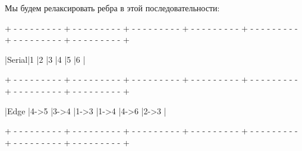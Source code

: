 \vspace{\baselineskip}

Мы будем релаксировать ребра в этой последовательности:

\vspace{\baselineskip}

\begin{tcolorbox}
{\tiny{+ - - - - - - - - - + - - - - - - - - - + - - - - - - - - - + - - - - - - - - - + - - - - - - - - - + - - - - - - - - - + - - - - - - - - - +}}

\hspace{0.4mm}|\hspace{3.7mm}Serial\hspace{3.6mm}|\hspace{7.1mm}1\hspace{7.1mm} |\hspace{7.1mm}2\hspace{7.1mm} |\hspace{7.1mm}3\hspace{6.8mm} |\hspace{7.1mm}4\hspace{7.1mm} |\hspace{7.1mm}5\hspace{6.8mm} |\hspace{6.8mm}6\hspace{7.3mm} |

{\tiny{+ - - - - - - - - - + - - - - - - - - - + - - - - - - - - - + - - - - - - - - - + - - - - - - - - - + - - - - - - - - - + - - - - - - - - - +}}

\hspace{0.4mm}|\hspace{3.5mm}Edge\hspace{3.5mm}
|\hspace{3.7mm}4->5\hspace{3.7mm} |\hspace{3.7mm}3->4\hspace{3.7mm} |\hspace{3.7mm}1->3\hspace{3.7mm} |\hspace{3.7mm}1->4\hspace{3.7mm} |\hspace{3.7mm}4->6\hspace{3.7mm} |\hspace{3.7mm}2->3\hspace{3.7mm} |

{\tiny{+ - - - - - - - - - + - - - - - - - - - + - - - - - - - - - + - - - - - - - - - + - - - - - - - - - + - - - - - - - - - + - - - - - - - - - +}}
\end{tcolorbox}

